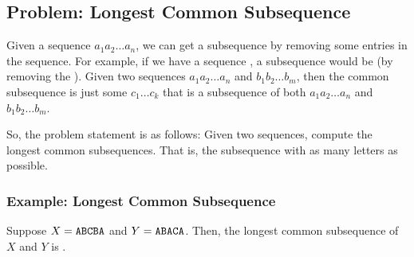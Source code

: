 \documentclass[letterpaper]{article}
\begin{document}
\subsection{Problem: Longest Common Subsequence}
Given a sequence $a_1 a_2 \dots a_n$, we can get a subsequence by removing some entries in the sequence. For example, if we have a sequence , a subsequence would be  (by removing the ). Given two sequences $a_1 a_2 \dots a_n$ and $b_1 b_2 \dots b_m$, then the common subsequence is just some $c_1 \dots c_k$ that is a subsequence of both $a_1 a_2 \dots a_n$ and $b_1 b_2 \dots b_m$. 

\bigskip 

So, the problem statement is as follows: Given two sequences, compute the longest common subsequences. That is, the subsequence with as many letters as possible. 

\subsubsection{Example: Longest Common Subsequence}
Suppose $X = \texttt{ABCBA}$ and $Y = \texttt{ABACA}$. Then, the longest common subsequence of $X$ and $Y$ is .
\end{document}
